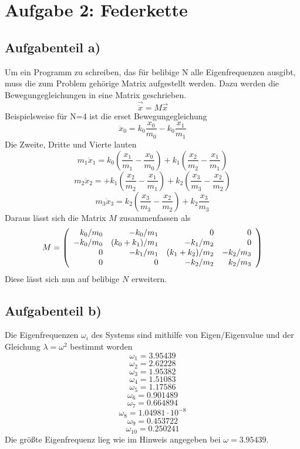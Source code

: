 \section*{Aufgabe 2: Federkette }

\subsection*{Aufgabenteil a)}

  Um ein Programm zu schreiben, das für belibige N alle Eigenfrequenzen ausgibt,
  muss die zum Problem gehörige Matrix aufgestellt werden.
  Dazu werden die Bewegungegleichungen in eine Matrix geschrieben.
  \begin{equation}
    \vec{\ddot{x}} = M \vec{x}
  \end{equation}
  Beispielsweise für N=4 ist die erset Bewegungegleichung
  \begin{equation}
    \ddot{x}_0 = k_0 \frac{x_0}{m_0} - k_0 \frac{x_1}{m_1}
  \end{equation}
  Die Zweite, Dritte und Vierte lauten
  \begin{equation}
    m_1 \ddot{x}_1 = k_0 (\frac{x_1}{m_1}-\frac{x_0}{m_0}) + k_1 (\frac{x_2}{m_2}-\frac{x_1}{m_1} )
  \end{equation}
  \begin{equation}
    m_2 \ddot{x}_2 = + k_1 (\frac{x_2}{m_2}-\frac{x_1}{m_1} )+ k_2(\frac{x_3}{m_3}-\frac{x_2}{m_2})
  \end{equation}
  \begin{equation}
    m_3 \ddot{x}_3 = k_2 (\frac{x_3}{m_3}-\frac{x_2}{m_2}) + k_2 \frac{x_3}{m_3}
  \end{equation}
  Daraus lässt sich die Matrix $M$  zusammenfassen als
  \begin{equation}
    M =
    \left(\begin{array}{r r r r}
     k_0/m_0   & -k_0/m_1       & 0               &  0        \\
     -k_0/m_0  & (k_0+k_1)/m_1  &  -k_1/m_2       &  0        \\
      0        & -k_1/m_1       & (k_1+k_2)/m_2   & -k_2/m_3  \\
      0        & 0              &  -k_2/m_2       & k_2/m_3   \\
    \end{array}\right)
  \end{equation}
  Diese lässt sich nun auf belibige $N$ erweitern.



\subsection*{Aufgabenteil b)}

  Die Eigenfrequenzen $\omega_i$ des Systems sind mithilfe von Eigen/Eigenvalue
  und der Gleichung $\lambda = \omega^2$
  bestimmt worden
  $$ \omega_1 = 3.95439  $$
  $$ \omega_2 = 2.62228  $$
  $$ \omega_3 = 1.95382  $$
  $$ \omega_4 = 1.51083  $$
  $$ \omega_5 = 1.17586  $$
  $$ \omega_6 = 0.901489  $$
  $$ \omega_7 = 0.664894  $$
  $$ \omega_8 = 1.04981\cdot 10^{-8}  $$
  $$ \omega_9 = 0.453722  $$
  $$ \omega_{10} = 0.250241  $$
  Die größte Eigenfrequenz lieg wie im Hinweis angegeben bei
  $\omega=3.95439$.


